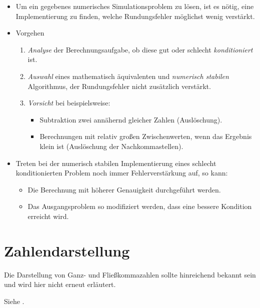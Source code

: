     \begin{itemize}
    	\item Um ein gegebenes numerisches Simulationsproblem zu lösen, ist es nötig, eine Implementierung zu finden, welche Rundungsfehler möglichst wenig verstärkt.
    	\item Vorgehen
        	\begin{enumerate}
        		\item \textit{Analyse} der Berechnungsaufgabe, ob diese gut oder schlecht \textit{konditioniert} ist.
        		\item \textit{Auswahl} eines mathematisch äquivalenten und \textit{numerisch stabilen} Algorithmus, der Rundungsfehler nicht zusätzlich verstärkt.
        		\item \textit{Vorsicht} bei beispielsweise:
	        		\begin{itemize}
	        			\item Subtraktion zwei annähernd gleicher Zahlen (Auslöschung).
	        			\item Berechnungen mit relativ großen Zwischenwerten, wenn das Ergebnis klein ist (Auslöschung der Nachkommastellen).
	        		\end{itemize}
        	\end{enumerate}
        \item Treten bei der numerisch stabilen Implementierung eines schlecht konditionierten Problem noch immer Fehlerverstärkung auf, so kann:
	        \begin{itemize}
	        	\item Die Berechnung mit höherer Genauigkeit durchgeführt werden.
	        	\item Das Ausgangsproblem so modifiziert werden, dass eine bessere Kondition erreicht wird.
	        \end{itemize}
    \end{itemize}

    \section{Zahlendarstellung} %
        Die Darstellung von Ganz- und Fließkommazahlen sollte hinreichend bekannt sein und wird hier nicht erneut erläutert.
        
        Siehe .

